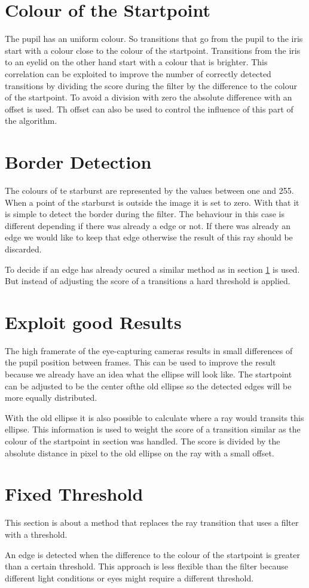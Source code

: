 \section{Colour of the Startpoint}
\label{sec:colorStartpoint}
The pupil has an uniform colour. So transitions that go from the pupil to the iris start with a colour close to the colour of the startpoint. Transitions from the iris to an eyelid on the other hand start with a colour that is brighter. This correlation can be exploited to improve the number of correctly detected transitions by dividing the score during the filter by the difference to the colour of the startpoint. To avoid a division with zero the absolute difference with an offset is used. Th offset can also be used to control the influence of this part of the algorithm.  
\section{Border Detection}
\label{sec:randdetektion}
The colours of te starburst are represented by the values between one and 255. When a point of the starburst is outside the image it is set to zero. With that it is simple to detect the border during the filter. The behaviour in this case is different depending if there was already a edge or not. If there was already an edge we would like to keep that edge otherwise the result of this ray should be discarded. 

To decide if an edge has already ocured a similar method as in section \ref{sec:colorStartpoint} is used. But instead of adjusting the score of a transitions a hard threshold is applied. 
\section{Exploit good Results}
\label{sec:goodResults}

The high framerate of the eye-capturing cameras results in small differences of the pupil position between frames. This can be used to improve the result because we already have an idea what the ellipse will look like. The startpoint can be adjusted to be the center ofthe old ellipse so the detected edges will be more equally distributed.

With the old ellipse it is also possible to calculate where a ray would transits this ellipse. This information is used to weight the score of a transition similar as the colour of the startpoint in section \label{sec:colorStartpoint} was handled. The score is divided by the absolute distance in pixel to the old ellipse on the ray with a small offset.
\section{Fixed Threshold}
\label{sec:fixedThreshold}
This section is about a method that replaces the ray transition that uses a filter with a threshold. 

An edge is detected when the difference to the colour of the startpoint is greater than a certain threshold. This approach is less flexible than the filter because different light conditions or eyes might require a different threshold. 




